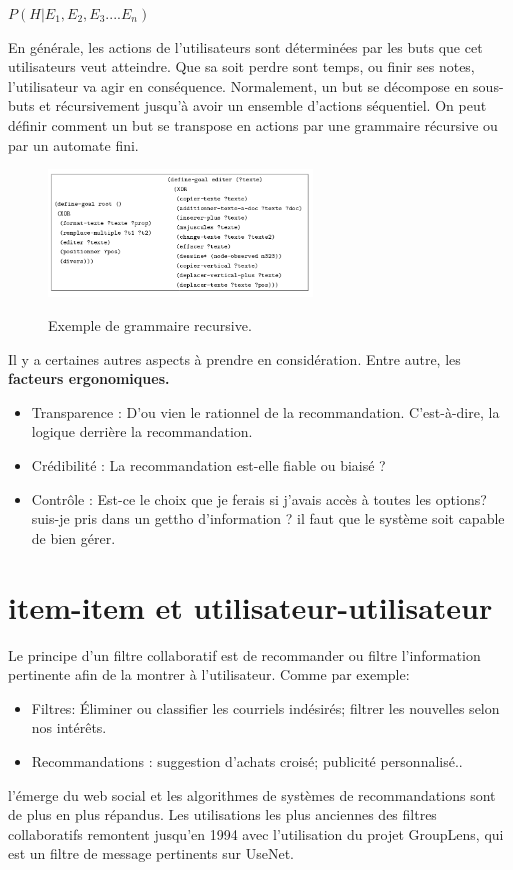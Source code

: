 \documentclass[oneside]{book}
\begin{document}
\centering
$P(H|E_1,E_2,E_3....E_n)$
\justify

En générale, les actions de l'utilisateurs sont déterminées par les buts que cet utilisateurs veut atteindre. Que sa soit perdre sont temps, ou finir ses notes, l'utilisateur va agir en conséquence. Normalement, un but se décompose en sous-buts et récursivement jusqu'à avoir un ensemble d'actions séquentiel. On peut définir comment un but se transpose en actions par une grammaire récursive ou par un automate fini.\\

\begin{figure}[!ht]
\centering
\includegraphics[width = 7cm]{grammaire_recursive.png}
\label{fig:grammaire_recursive}
\caption{Exemple de grammaire recursive.}
\end{figure}

Il y a certaines autres aspects à prendre en considération. Entre autre, les \textbf{facteurs ergonomiques.}
\begin{itemize}
\item Transparence : D'ou vien le rationnel de la recommandation. C'est-à-dire, la logique derrière la recommandation.
\item Crédibilité : La recommandation est-elle fiable ou biaisé ?
\item Contrôle : Est-ce le choix que je ferais si j'avais accès à toutes les options? suis-je pris dans un gettho d'information ? il faut que le système soit capable de bien gérer.
\end{itemize}
\section{item-item et utilisateur-utilisateur}
Le principe d'un filtre collaboratif est de recommander ou filtre l'information pertinente afin de la montrer à l'utilisateur. Comme par exemple:
\begin{itemize}
\item Filtres: Éliminer ou classifier les courriels indésirés; filtrer les nouvelles selon nos intérêts. 
\item Recommandations : suggestion d'achats croisé; publicité personnalisé..
\end{itemize}
l'émerge du web social et les algorithmes de systèmes de recommandations sont de plus en plus répandus. Les utilisations les plus anciennes des filtres collaboratifs remontent jusqu'en 1994 avec l'utilisation du projet GroupLens, qui est un filtre de message pertinents sur UseNet.\\
\end{document}
